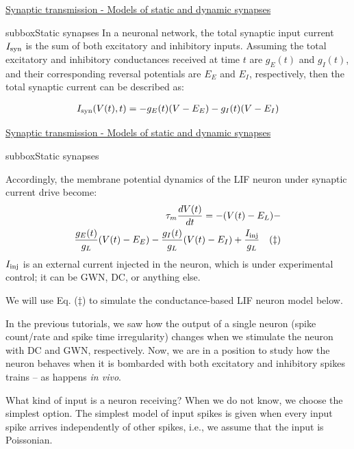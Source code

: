 \begin{textbox}{\href{https://compneuro.neuromatch.io/tutorials/W2D3_BiologicalNeuronModels/student/W2D3_Tutorial3.html}{Synaptic transmission - Models of static and dynamic synapses } }
\begin{subbox}{subbox}{Static synapses}
In a neuronal network, the total synaptic input current $I_{\rm syn}$ is the sum of both excitatory and inhibitory inputs. Assuming the total excitatory and inhibitory conductances received at time $t$ are $g_E(t)$ and $g_I(t)$, and their corresponding reversal potentials are $E_E$ and $E_I$, respectively, then the total synaptic current can be described as: 

\begin{align}
I_{\rm syn}(V(t),t) = -g_E(t) (V-E_E) - g_I(t) (V-E_I)
\end{align}


\end{subbox}
\end{textbox}

\begin{textbox}{\href{https://compneuro.neuromatch.io/tutorials/W2D3_BiologicalNeuronModels/student/W2D3_Tutorial3.html}{Synaptic transmission - Models of static and dynamic synapses } }
\begin{subbox}{subbox}{Static synapses}
\scriptsize

Accordingly, the membrane potential dynamics of the LIF neuron under synaptic current drive become:
\begin{eqnarray*}
\tau_m\frac{dV(t)}{dt} = -(V(t)-E_L) -\\ \frac{g_E(t)}{g_L} (V(t)-E_E) - \frac{g_I(t)}{g_L} (V(t)-E_I) + \frac{I_{\rm inj}}{g_L}\quad (\ddagger)
\end{eqnarray*}
$I_{\rm inj}$ is an external current injected in the neuron, which is under experimental control; it can be GWN, DC, or anything else.

We will use Eq. ($\ddagger$) to simulate the conductance-based LIF neuron model below.

In the previous tutorials, we saw how the output of a single neuron (spike count/rate and spike time irregularity) changes when we stimulate the neuron with DC and GWN, respectively. Now, we are in a position to study how the neuron behaves when it is bombarded with both excitatory and inhibitory spikes trains -- as happens \textit{in vivo}.

What kind of input is a neuron receiving? When we do not know, we choose the simplest option. The simplest model of input spikes is given when every input spike arrives independently of other spikes, i.e., we assume that the input is Poissonian.

\end{subbox}



\end{textbox}
